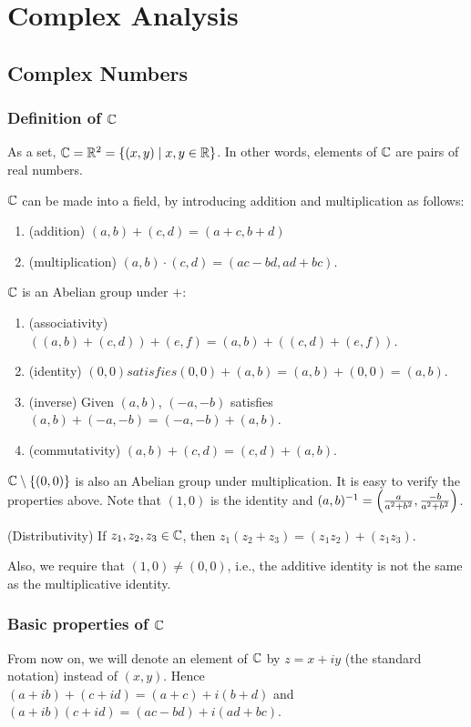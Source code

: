 \part{Complex Analysis}
\chapter{Complex Numbers}
\section{Definition of $\mathbb C$}
As a set, $\mathbb C=\mathbb R^2=\{(x,y)\mid x,y\in\mathbb R\}$. In other words, elements of $\mathbb C$ are pairs of real numbers.

$\mathbb C$ can be made into a field, by introducing addition and multiplication as
follows:
\begin{enumerate}[label=(\arabic*)]
\item (addition) $(a,b)+(c,d)=(a+c,b+d)$
\item (multiplication) $(a,b)\cdot(c,d)=(ac-bd,ad+bc)$.
\end{enumerate}

$\mathbb C$ is an Abelian group under $+$:
\begin{enumerate}
\item (associativity) $((a, b) + (c, d)) + (e, f) = (a, b) + ((c, d) + (e, f))$.
\item (identity) $(0,0) satisfies (0,0)+(a,b)=(a,b)+(0,0)=(a,b)$.
\item (inverse) Given $(a,b)$, $(-a,-b)$ satisfies $(a,b)+(-a,-b)=(-a,-b)+(a,b)$.
\item (commutativity) $(a,b)+(c,d)=(c,d)+(a,b)$.
\end{enumerate}

$\mathbb C\setminus\{(0,0)\}$ is also an Abelian group under multiplication. It is easy to verify the properties above. Note that $(1,0)$ is the identity and $(a,b)^{-1}=\left(\frac{a}{a^2+b^2},\frac{-b}{a^2+b^2}\right)$.

(Distributivity) If $z_1,z_2,z_3\in\mathbb C$, then $z_1(z_2+z_3)=(z_1z_2)+(z_1z_3)$.

Also, we require that $(1,0)\neq(0,0)$, i.e., the additive identity is not the same as the multiplicative identity.

\section{Basic properties of $\mathbb C$}
From now on, we will denote an element of $\mathbb C$ by $z=x+iy$ (the standard notation) instead of $(x, y)$. Hence $(a+ib)+(c+id)=(a+c)+i(b+d)$ and $(a+ib)(c+id) = (ac-bd)+i(ad+bc)$.

